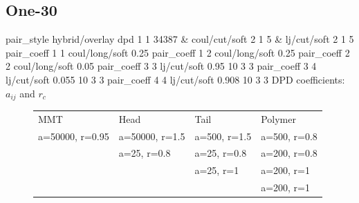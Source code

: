 \documentclass[a4paper]{article}
\begin{document}
\subsection*{One-30}
pair\_style hybrid/overlay dpd 1 1 34387 \& coul/cut/soft 2 1 5 \& 
lj/cut/soft 2 1 5\newline
pair\_coeff 1 1 coul/long/soft 0.25\newline
pair\_coeff 1 2 coul/long/soft 0.25\newline
pair\_coeff 2 2 coul/long/soft 0.05\newline
pair\_coeff 3 3 lj/cut/soft 0.95  10 3 3\newline
pair\_coeff 3 4 lj/cut/soft 0.055 10 3 3\newline
pair\_coeff 4 4 lj/cut/soft 0.908 10 3 3\newline
DPD coefficients: $a_{ij}$ and $r_c$
\begin{figure}[H]\begin{tabular}{llll}
MMT             & Head           & Tail         & Polymer      \\
a=50000, r=0.95 & a=50000, r=1.5 & a=500, r=1.5 & a=500, r=0.8 \\
                & a=25,    r=0.8 & a=25,  r=0.8 & a=200, r=0.8 \\
                &                & a=25,  r=1   & a=200, r=1   \\
                &                &              & a=200, r=1   \\
\end{tabular}\end{figure}
\end{document}
